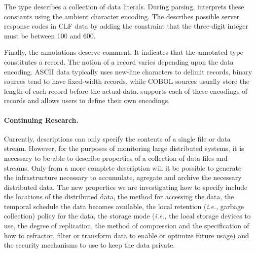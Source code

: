 \documentclass{sigplanconf}
\begin{document}
The
 type  describes a collection of data literals.
During parsing, \pads{} interprets these constants using the ambient
character encoding.  The   describes
possible server response codes in CLF data by adding the constraint
that the three-digit integer must be between 100 and 600.

Finally, the  annotations deserve comment. It
indicates that the annotated type constitutes a record.  
The notion of a record varies depending upon the data encoding.  
ASCII data typically uses new-line characters to delimit 
records, binary sources tend to have fixed-width records, while 
COBOL sources usually store the length of each record before the actual data.
\pads{} supports each of these encodings of records and allows users to define
their own encodings.  

\paragraph{Continuing Research.}  Currently, \pads{} descriptions can only specify
the contents of a single file or data stream.  However, for the purposes of monitoring large distributed systems,
it is necessary to be able to describe properties of a collection of data files and streams.
Only from a more complete description will it be possible to generate the infrastructure necessary
to accumulate, agregate and archive the necessary distributed data.  The new properties we are 
investigating how to specify include the locations of the distributed data, the method for accessing
the data, the temporal schedule the data becomes available, the local retention ({\em i.e.,} garbage collection)
policy for the data, the
storage mode ({\em i.e.,} the local storage devices to use, the degree of replication, the method of 
compression and the specification of how to refractor, filter or transform data to enable or optimize 
future usage) and the security mechanisms to use to keep the data private. 
\end{document}

